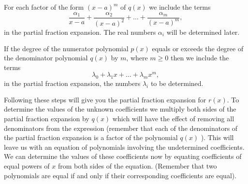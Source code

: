 \documentclass[extrafontsizes, twoside, a4paper]{memoir}
\theoremstyle{plain}%
\theoremstyle{definition}
\theoremstyle{remark}
\begin{document}
For each factor of the form $(x-a)^m$  of $q(x)$  we include the
terms
$$\dfrac{\alpha_1  }{x - a} + \dfrac{\alpha_2}{(x -a)^2} + \dots + \dfrac{\alpha_m }{(x-a)^m},$$
in the partial fraction expansion. The real  numbers $\alpha_i$ will
be determined later.

If the degree of the numerator polynomial $p(x)$ equals or exceeds
the degree of the denominator polynomial $q(x)$ by $m$, where $m
\geq 0$ then we include the terms
$$\lambda_0 + \lambda_1 x + \dots + \lambda_m x^m,$$
in the partial fraction expansion, the numbers $\lambda_i$ to be
determined.

Following these steps will give you the partial fraction expansion
for $r(x)$. To determine the values of the unknown coefficients we
multiply both sides of the partial fraction expansion by $q(x)$
which will have the effect of removing all denominators from the
expression (remember that each of the denominators of the partial
fraction expansion is a factor of the polynomial $q(x)$ ). This will
leave us with an equation of polynomials involving the undetermined
coefficients. We can determine the values of these coefficients now
by equating coefficients of equal powers of $x$ from both sides of
the equation. (Remember that two polynomials are equal if and only
if their corresponding coefficients are equal).
\end{document}
